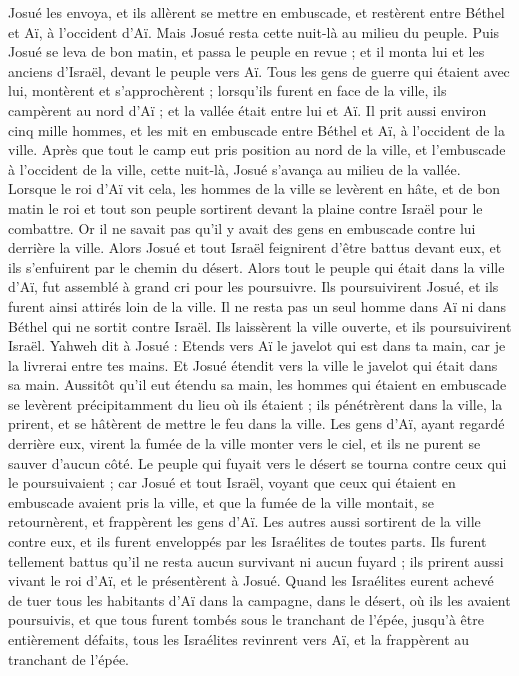 \begin{multicols}{2}
Josué les envoya, et ils allèrent se mettre en embuscade, et restèrent entre Béthel et Aï, à l’occident d’Aï. Mais Josué resta cette nuit-là au milieu du peuple.
Puis Josué se leva de bon matin, et passa le peuple en revue ; et il monta lui et les anciens d’Israël, devant le peuple vers Aï.
Tous les gens de guerre qui étaient avec lui, montèrent et s’approchèrent ; lorsqu’ils furent en face de la ville, ils campèrent au nord d’Aï ; et la vallée était entre lui et Aï.
Il prit aussi environ cinq mille hommes, et les mit en embuscade entre Béthel et Aï, à l’occident de la ville.
Après que tout le camp eut pris position au nord de la ville, et l’embuscade à l’occident de la ville, cette nuit-là, Josué s’avança au milieu de la vallée.
Lorsque le roi d’Aï vit cela, les hommes de la ville se levèrent en hâte, et de bon matin le roi et tout son peuple sortirent devant la plaine contre Israël pour le combattre. Or il ne savait pas qu’il y avait des gens en embuscade contre lui derrière la ville.
Alors Josué et tout Israël feignirent d’être battus devant eux, et ils s’enfuirent par le chemin du désert.
Alors tout le peuple qui était dans la ville d’Aï, fut assemblé à grand cri pour les poursuivre. Ils poursuivirent Josué, et ils furent ainsi attirés loin de la ville.
Il ne resta pas un seul homme dans Aï ni dans Béthel qui ne sortit contre Israël. Ils laissèrent la ville ouverte, et ils poursuivirent Israël.
Yahweh dit à Josué : Etends vers Aï le javelot qui est dans ta main, car je la livrerai entre tes mains. Et Josué étendit vers la ville le javelot qui était dans sa main.
Aussitôt qu’il eut étendu sa main, les hommes qui étaient en embuscade se levèrent précipitamment du lieu où ils étaient ; ils pénétrèrent dans la ville, la prirent, et se hâtèrent de mettre le feu dans la ville.
Les gens d’Aï, ayant regardé derrière eux, virent la fumée de la ville monter vers le ciel, et ils ne purent se sauver d’aucun côté. Le peuple qui fuyait vers le désert se tourna contre ceux qui le poursuivaient ;
car Josué et tout Israël, voyant que ceux qui étaient en embuscade avaient pris la ville, et que la fumée de la ville montait, se retournèrent, et frappèrent les gens d’Aï.
Les autres aussi sortirent de la ville contre eux, et ils furent enveloppés par les Israélites de toutes parts. Ils furent tellement battus qu’il ne resta aucun survivant ni aucun fuyard ;
ils prirent aussi vivant le roi d’Aï, et le présentèrent à Josué.
Quand les Israélites eurent achevé de tuer tous les habitants d’Aï dans la campagne, dans le désert, où ils les avaient poursuivis, et que tous furent tombés sous le tranchant de l’épée, jusqu’à être entièrement défaits, tous les Israélites revinrent vers Aï, et la frappèrent au tranchant de l’épée.

\end{multicols}

